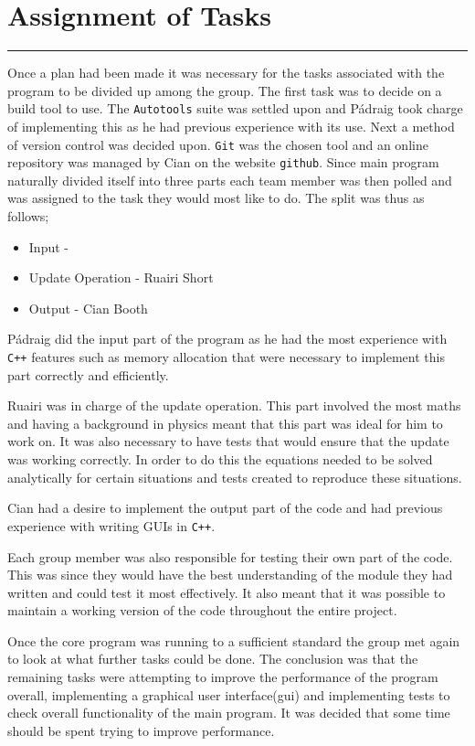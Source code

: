 \section{Assignment of Tasks}
\vspace{-2em}\rule{\textwidth}{1pt}\vspace{1em}

Once a plan had been made it was necessary for the tasks associated with the program to be divided up among the group.
The first task was to decide on a build tool to use.
The \texttt{Autotools} suite was settled upon and P\'{a}draig took charge of implementing this as he had previous experience with its use.
Next a method of version control was decided upon.
\texttt{Git} was the chosen tool and an online repository was managed by Cian on the website \texttt{github}.
Since main program naturally divided itself into three parts each team member was then polled and was assigned to the task they would most like to do.
The split was thus as follows;
\begin{itemize}
\item Input - \pa
\item Update Operation - Ruairi Short
\item Output - Cian Booth
\end{itemize}

P\'{a}draig did the input part of the program as he had the most experience with \texttt{C++} features such as memory allocation that were necessary to implement this part correctly and efficiently.

Ruairi was in charge of the update operation.
This part involved the most maths and having a background in physics meant that this part was ideal for him to work on.
It was also necessary to have tests that would ensure that the update was working correctly.
In order to do this the equations needed to be solved analytically for certain situations and tests created to reproduce these situations.

Cian had a desire to implement the output part of the code and had previous experience with writing GUIs in \texttt{C++}.

Each group member was also responsible for testing their own part of the code.
This was since they would have the best understanding of the module they had written and could test it most effectively.
It also meant that it was possible to maintain a working version of the code throughout the entire project.

Once the core program was running to a sufficient standard the group met again to look at what further tasks could be done.
The conclusion was that the remaining tasks were attempting to improve the performance of the program overall, implementing a graphical user interface(gui) and implementing tests to check overall functionality of the main program.
It was decided that some time should be spent trying to improve performance.

